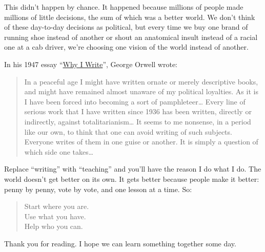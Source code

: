 This didn't happen by chance. It happened because millions of people
made millions of little decisions, the sum of which was a better world.
We don't think of these day-to-day decisions as political, but every
time we buy one brand of running shoe instead of another or shout an
anatomical insult instead of a racial one at a cab driver, we're
choosing one vision of the world instead of another.

In his 1947 essay ``\href{http://www.resort.com/~prime8/Orwell/whywrite.html}{Why I Write}'', George Orwell wrote:

\begin{quote}

In a peaceful age I might have written ornate or merely descriptive
books, and might have remained almost unaware of my political
loyalties. As it is I have been forced into becoming a sort of
pamphleteer{\ldots} Every line of serious work that I have
written since 1936 has been written, directly or indirectly, against
totalitarianism{\ldots} It seems to me nonsense, in a period
like our own, to think that one can avoid writing of such subjects.
Everyone writes of them in one guise or another. It is simply a
question of which side one takes{\ldots}

\end{quote}

Replace ``writing'' with ``teaching'' and you'll have the reason I do what I
do. The world doesn't get better on its own. It gets better because
people make it better: penny by penny, vote by vote, and one lesson at a
time. So:

\begin{quote}

Start where you are.\\
Use what you have.\\
Help who you can.

\end{quote}

Thank you for reading. I hope we can learn something together some day.
